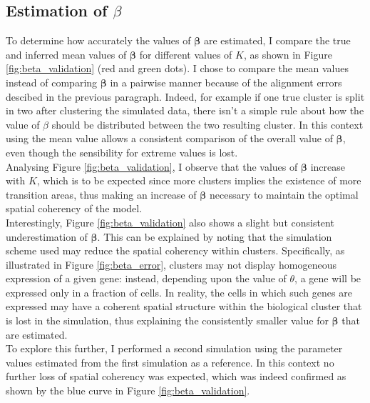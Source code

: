 	\subsection{Estimation of $\beta$}\label{subsec:beta_estimation}
	To determine how accurately the values of $\boldsymbol{\beta}$ are estimated, I compare the true and inferred mean values of $\boldsymbol{\beta}$ for different values of $K$, as shown in Figure \ref{fig:beta_validation} (red and green dots). I chose to compare the mean values instead of comparing $\boldsymbol{\beta}$ in a pairwise manner because of the alignment errors descibed in the previous paragraph. Indeed, for example if one true cluster is split in two after clustering the simulated data, there isn't a simple rule about how the value of $\beta$ should be distributed between the two resulting cluster. In this context using the mean value allows a consistent comparison of the overall value of $\boldsymbol{\beta}$, even though the sensibility for extreme values is lost.\\

	 Analysing Figure \ref{fig:beta_validation}, I observe that the values of $\boldsymbol{\beta}$ increase with $K$, which is to be expected since more clusters implies the existence of more transition areas, thus making an increase of $\boldsymbol{\beta}$ necessary to maintain the optimal spatial coherency of the model.\\
	
	Interestingly, Figure \ref{fig:beta_validation} also shows a slight but consistent underestimation of $\boldsymbol{\beta}$. This can be explained by noting that the simulation scheme used may reduce the spatial coherency within clusters. Specifically, as illustrated in Figure \ref{fig:beta_error}, clusters may not display homogeneous expression of a given gene: instead, depending upon the value of $\theta$, a gene will be expressed only in a fraction of cells. In reality, the cells in which such genes are expressed may have a coherent spatial structure within the biological cluster that is lost in the simulation, thus explaining the consistently smaller value for $\boldsymbol{\beta}$ that are estimated.\\
	
	 To explore this further, I performed a second simulation using the parameter values estimated from the first simulation as a reference. In this context no further loss of spatial coherency was expected, which was indeed confirmed as shown by the blue curve in Figure \ref{fig:beta_validation}.\\
	
